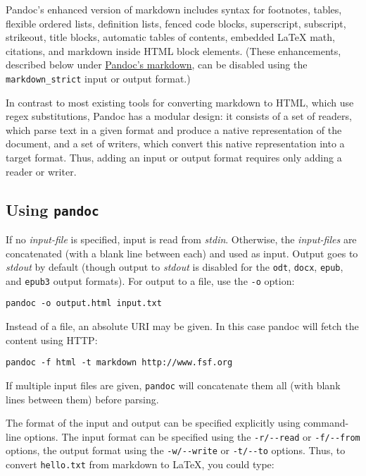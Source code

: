 \documentclass[]{article}
\begin{document}
Pandoc's enhanced version of markdown includes syntax for footnotes,
tables, flexible ordered lists, definition lists, fenced code blocks,
superscript, subscript, strikeout, title blocks, automatic tables of
contents, embedded LaTeX math, citations, and markdown inside HTML block
elements. (These enhancements, described below under
\hyperref[pandocs-markdown]{Pandoc's markdown}, can be disabled using
the \texttt{markdown\_strict} input or output format.)

In contrast to most existing tools for converting markdown to HTML,
which use regex substitutions, Pandoc has a modular design: it consists
of a set of readers, which parse text in a given format and produce a
native representation of the document, and a set of writers, which
convert this native representation into a target format. Thus, adding an
input or output format requires only adding a reader or writer.

\subsection{Using \texttt{pandoc}}\label{using-pandoc}

If no \emph{input-file} is specified, input is read from \emph{stdin}.
Otherwise, the \emph{input-files} are concatenated (with a blank line
between each) and used as input. Output goes to \emph{stdout} by default
(though output to \emph{stdout} is disabled for the \texttt{odt},
\texttt{docx}, \texttt{epub}, and \texttt{epub3} output formats). For
output to a file, use the \texttt{-o} option:

\begin{verbatim}
pandoc -o output.html input.txt
\end{verbatim}

Instead of a file, an absolute URI may be given. In this case pandoc
will fetch the content using HTTP:

\begin{verbatim}
pandoc -f html -t markdown http://www.fsf.org
\end{verbatim}

If multiple input files are given, \texttt{pandoc} will concatenate them
all (with blank lines between them) before parsing.

The format of the input and output can be specified explicitly using
command-line options. The input format can be specified using the
\texttt{-r/-{}-read} or \texttt{-f/-{}-from} options, the output format
using the \texttt{-w/-{}-write} or \texttt{-t/-{}-to} options. Thus, to
convert \texttt{hello.txt} from markdown to LaTeX, you could type:
\end{document}
